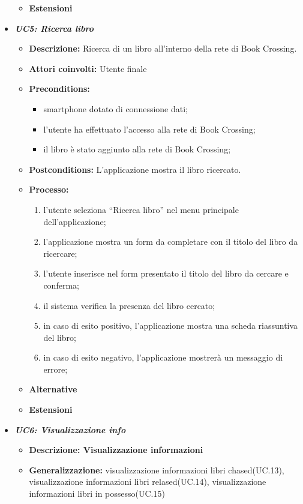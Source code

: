 \begin{itemize}
\begin{itemize}
		\item \textbf{Estensioni}
	\end{itemize}
	\item \textbf{\textit{UC5: Ricerca libro}}
	\begin{itemize}
		\item \textbf{Descrizione:} Ricerca di un libro all’interno della rete di Book Crossing.
		\item \textbf{Attori coinvolti:} Utente finale
		\item \textbf{Preconditions:}
		\begin{itemize}
			\item smartphone dotato di connessione dati;
			\item l’utente ha effettuato l’accesso alla rete di Book Crossing;
			\item il libro è stato aggiunto alla rete di Book Crossing;
		\end{itemize}
		\item \textbf{Postconditions:} L'applicazione mostra il libro ricercato.
		\item \textbf{Processo:}
		\begin{enumerate}
			\item l’utente seleziona “Ricerca libro” nel menu principale dell’applicazione;
			\item l’applicazione mostra un form da completare con il titolo del libro da ricercare;
			\item l’utente inserisce nel form presentato il titolo del libro da cercare e conferma;
			\item il sistema verifica la presenza del libro cercato;
			\item in caso di esito positivo, l’applicazione mostra una scheda riassuntiva del libro;
			\item in caso di esito negativo, l’applicazione mostrerà un messaggio di errore;
		\end{enumerate}
		\item \textbf{Alternative}
		\item \textbf{Estensioni}
	\end{itemize}
	\item \textbf{\textit{UC6: Visualizzazione info}}
	\begin{itemize}
		\item \textbf{Descrizione: Visualizzazione informazioni}
		\item \textbf{Generalizzazione:} visualizzazione informazioni libri chased(UC.13), visualizzazione informazioni libri relased(UC.14), visualizzazione informazioni libri in possesso(UC.15)

\end{itemize}
\end{itemize}
